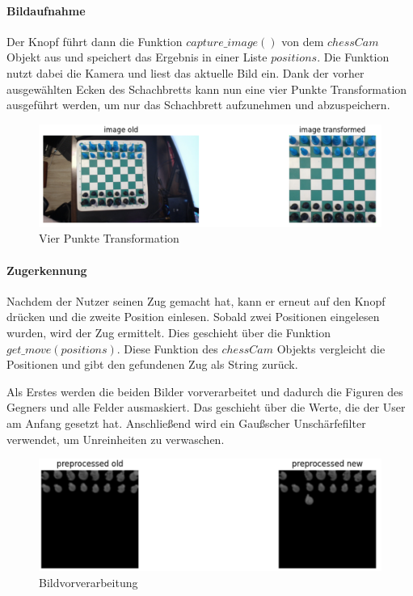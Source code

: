 \paragraph{Bildaufnahme}
Der Knopf führt dann die Funktion \(capture\_image()\) von dem \(chessCam\) Objekt aus und speichert das Ergebnis in einer Liste \(positions\).
Die Funktion nutzt dabei die Kamera und liest das aktuelle Bild ein. Dank der vorher ausgewählten Ecken des Schachbretts kann nun eine vier Punkte Transformation 
ausgeführt werden, um nur das Schachbrett aufzunehmen und abzuspeichern.
\begin{figure}[H]
    \centering
    \includegraphics[scale=0.5]{images/transformed_image.png}
    \caption{Vier Punkte Transformation}
\end{figure} 

\paragraph{Zugerkennung}
Nachdem der Nutzer seinen Zug gemacht hat, kann er erneut auf den Knopf drücken und die zweite Position einlesen.
Sobald zwei Positionen eingelesen wurden, wird der Zug ermittelt. Dies geschieht über die Funktion \(get\_move(positions)\).
Diese Funktion des \(chessCam\) Objekts vergleicht die Positionen und gibt den gefundenen Zug als String zurück.

Als Erstes werden die beiden Bilder vorverarbeitet und dadurch die Figuren des Gegners und alle Felder ausmaskiert. Das geschieht über die Werte, die 
der User am Anfang gesetzt hat. Anschließend wird ein Gaußscher Unschärfefilter verwendet, um Unreinheiten zu verwaschen. 
\begin{figure}[H]
    \centering
    \includegraphics[scale=0.5]{images/preprocessed_image.png}
    \caption{Bildvorverarbeitung}
\end{figure} 

